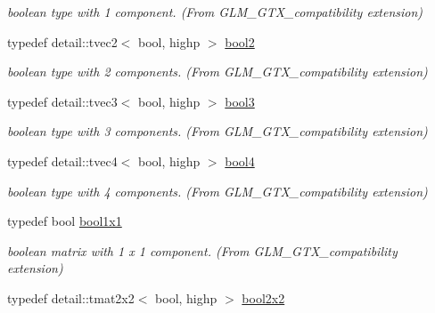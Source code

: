 \begin{CompactItemize}
\begin{CompactList}\small\item\em boolean type with 1 component. (From GLM\_\-GTX\_\-compatibility extension) \item\end{CompactList}\item 
\hypertarget{group__gtx__compatibility_gfede6e8549e9bb9da63f404022298d40}{
typedef detail::tvec2$<$ bool, highp $>$ \hyperlink{group__gtx__compatibility_gfede6e8549e9bb9da63f404022298d40}{bool2}}
\label{group__gtx__compatibility_gfede6e8549e9bb9da63f404022298d40}

\begin{CompactList}\small\item\em boolean type with 2 components. (From GLM\_\-GTX\_\-compatibility extension) \item\end{CompactList}\item 
\hypertarget{group__gtx__compatibility_gd18ebb149851844fd704e138c4af9a44}{
typedef detail::tvec3$<$ bool, highp $>$ \hyperlink{group__gtx__compatibility_gd18ebb149851844fd704e138c4af9a44}{bool3}}
\label{group__gtx__compatibility_gd18ebb149851844fd704e138c4af9a44}

\begin{CompactList}\small\item\em boolean type with 3 components. (From GLM\_\-GTX\_\-compatibility extension) \item\end{CompactList}\item 
\hypertarget{group__gtx__compatibility_g6ef1f104d22f384c4d59f2b1ca1768a7}{
typedef detail::tvec4$<$ bool, highp $>$ \hyperlink{group__gtx__compatibility_g6ef1f104d22f384c4d59f2b1ca1768a7}{bool4}}
\label{group__gtx__compatibility_g6ef1f104d22f384c4d59f2b1ca1768a7}

\begin{CompactList}\small\item\em boolean type with 4 components. (From GLM\_\-GTX\_\-compatibility extension) \item\end{CompactList}\item 
\hypertarget{group__gtx__compatibility_g98d9d3da22aebc872ba38ce5afa0eff7}{
typedef bool \hyperlink{group__gtx__compatibility_g98d9d3da22aebc872ba38ce5afa0eff7}{bool1x1}}
\label{group__gtx__compatibility_g98d9d3da22aebc872ba38ce5afa0eff7}

\begin{CompactList}\small\item\em boolean matrix with 1 x 1 component. (From GLM\_\-GTX\_\-compatibility extension) \item\end{CompactList}\item 
\hypertarget{group__gtx__compatibility_g44cd09c0dad9ea163f038a342555867f}{
typedef detail::tmat2x2$<$ bool, highp $>$ \hyperlink{group__gtx__compatibility_g44cd09c0dad9ea163f038a342555867f}{bool2x2}}
\label{group__gtx__compatibility_g44cd09c0dad9ea163f038a342555867f}


\end{CompactItemize}

